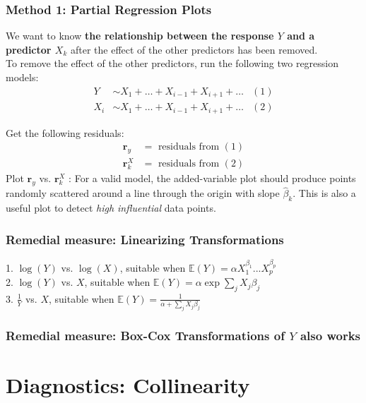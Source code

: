 \documentclass[11pt,a4paper]{article}
\begin{document}
\subsubsection{Method 1: Partial Regression Plots}
We want to know \textbf{the relationship between the response $Y$ and a predictor $X_{k}$} after the effect of the other predictors has been removed.\\
To remove the effect of the other predictors, run the following two regression models:
\begin{equation}
    \begin{aligned}
        Y &\sim X_{1}+\ldots+X_{i-1}+X_{i+1}+\ldots &(1)\\
X_{i} &\sim X_{1}+\ldots+X_{i-1}+X_{i+1}+\ldots &(2)
    \end{aligned}
    \nonumber
\end{equation}

Get the following residuals:
$$
\begin{aligned}
\mathbf{r}_{y} &=\text { residuals from }(1) \\
\mathbf{r}_{k}^{X} &=\text { residuals from }(2)
\end{aligned}
$$
Plot $\mathbf{r}_{y}$ vs. $\mathbf{r}_{k}^{X}$ : For a valid model, the added-variable plot should produce points randomly scattered around a line through the origin with slope $\hat{\beta}_{k}$. This is also a useful plot to detect \textit{high influential} data points.

\subsubsection{Remedial measure: Linearizing Transformations}
1. $\log(Y)$ vs. $\log(X)$, suitable when $\mathbb{E}(Y)=\alpha X_1^{\beta_1}...X_p^{\beta_p}$\\
2. $\log(Y)$ vs. $X$, suitable when $\mathbb{E}(Y)=\alpha \exp{\sum_j X_j\beta_j}$\\
3. $\frac{1}{Y}$ vs. $X$, suitable when $\mathbb{E}(Y)=\frac{1}{\alpha+{\sum_j X_j\beta_j}}$

\subsubsection{Remedial measure: Box-Cox Transformations of $Y$ also works}

\section{Diagnostics: Collinearity}
\end{document}

